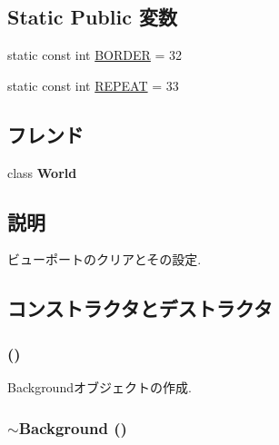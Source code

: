 \subsection*{Static Public 変数}
\begin{CompactItemize}
\item 
static const int \hyperlink{classm3g_1_1Background_ee380e01b33e589c24984e4c4c1c6501}{BORDER} = 32
\item 
static const int \hyperlink{classm3g_1_1Background_a466d02b3d88f856854d0a0955be32e8}{REPEAT} = 33
\end{CompactItemize}
\subsection*{フレンド}
\begin{CompactItemize}
\item 
\hypertarget{classm3g_1_1Background_7b4bcdf992c21ae83363f25df05b1d25}{
class \textbf{World}}
\label{classm3g_1_1Background_7b4bcdf992c21ae83363f25df05b1d25}

\end{CompactItemize}


\subsection{説明}
ビューポートのクリアとその設定. 

\subsection{コンストラクタとデストラクタ}
\hypertarget{classm3g_1_1Background_2bbc220bb63956558a8603a7909c2bbd}{
\subsubsection[{Background}]{ ()}}
\label{classm3g_1_1Background_2bbc220bb63956558a8603a7909c2bbd}


Backgroundオブジェクトの作成. \hypertarget{classm3g_1_1Background_b793cb50870532320856acdd2caf84c3}{
\subsubsection[{$\sim$Background}]{\setlength{\rightskip}{0pt plus 5cm}$\sim${\bf Background} ()}}
\label{classm3g_1_1Background_b793cb50870532320856acdd2caf84c3}


